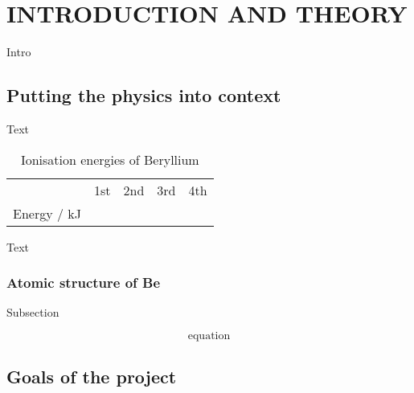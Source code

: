\chapter[CHAPTER 1]{INTRODUCTION AND THEORY}\label{ch:1} %
\pagestyle{plain}
\vspace{-6mm}
Intro

\section{Putting the physics into context}
\vspace{-8mm}
Text


\begin{table}[htb]
\centering
\caption{Ionisation energies of Beryllium}
\label{tab:char_fins_1}
\begin{tabular}{|l|c|c|c|c|}
\hline
\centering {\bfseries } & 1st & 2nd & 3rd & 4th \\ \Xhline{5\arrayrulewidth}
Energy / kJ  &  &  &  &   \\ \hline
\end{tabular}
\end{table}

Text

\subsection{Atomic structure of Be}
\vspace{-7mm}
Subsection




\begin{equation}
\label{equation:1}
   \text{equation} 
\end{equation}

\section{Goals of the project}



\vspace{-8mm}
